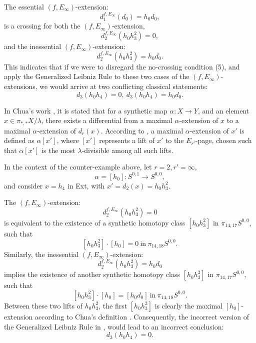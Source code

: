 \begin{remark}
    The essential $(f, E_\infty)$-extension:
        $$d_1^{f, E_\infty} (d_0) = h_0 d_0,$$
        is a crossing for both the $(f, E_\infty)$-extension,
        $$d_2^{f, E_\infty} (h_0 h_3^2) = 0,$$
        and the inessential $(f, E_\infty)$-extension:
        $$d_2^{f, E_\infty} (h_0 h_3^2) = h_0 d_0.$$
        This indicates that if we were to disregard the no-crossing condition (5), and apply the Generalized Leibniz Rule to these two cases of the $(f, E_\infty)$-extensions, we would arrive at two conflicting classical statements:
$$d_3(h_0h_4) = 0, \ d_3(h_0h_4) = h_0 d_0.$$
\end{remark}

\begin{remark} \label{rem:chuaerror}
    In Chua's work \cite[Theorem~12.9]{Chua}, it is stated that for a synthetic map $\alpha: X\rightarrow Y$, and an element $x \in \pi_{*,*}X/\lambda$, there exists a differential from a maximal $\alpha$-extension of $x$ to a maximal $\alpha$-extension of $d_r(x)$. According to  \cite[Definition~12.5]{Chua}, a maximal $\alpha$-extension of $x'$ is defined as $\alpha[x']$, where $[x']$ represents a lift of $x'$ to the $E_{r'}$-page, chosen such that $\alpha[x']$ is the most $\lambda$-divisible among all such lifts. 

    In the context of the counter-example above, let $r=2, r'=\infty$,
    $$\alpha = [h_0]: S^{0,1} \rightarrow S^{0,0},$$
    and consider $x = h_4$ in Ext, with $x' = d_2(x) = h_0h_3^2$.

    The $(f, E_\infty)$-extension:
        $$d_2^{f, E_\infty} (h_0 h_3^2) = 0$$
         is equivalent to the existence of a synthetic homotopy class $[h_0 h_3^2]$ in $\pi_{14, 17} S^{0,0}$, such that
        $$[h_0 h_3^2] \cdot [h_0] = 0 \ \text{in} \ \pi_{14,18}S^{0,0}.$$
        Similarly, the inessential $(f, E_\infty)$-extension: 
        $$d_2^{f, E_\infty} (h_0 h_3^2) = h_0 d_0$$
        implies the existence of another synthetic homotopy class $[h_0 h_3^2]$ in $\pi_{14, 17} S^{0,0}$, such that
        $$[h_0 h_3^2] \cdot [h_0] = [h_0d_0] \ \text{in} \ \pi_{14,18}S^{0,0}.$$
        Between these two lifts of $h_0h_3^2$, the first $[h_0h_3^2]$ is clearly the maximal $[h_0]$-extension according to Chua's definition \cite[Definition~12.5]{Chua}. Consequently, the incorrect version of the Generalized Leibniz Rule in \cite[Theorem~12.9]{Chua}, would lead to an incorrect conclusion:
        $$d_3(h_0h_4) = 0.$$
\end{remark}

